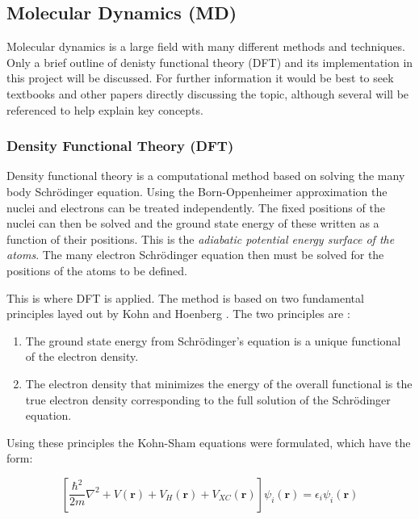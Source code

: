 \documentclass[a4paper,12pt]{article}
\begin{document}
\subsection{Molecular Dynamics (MD)}
Molecular dynamics is a large field with many different methods and techniques. Only a brief outline of denisty functional theory (DFT) and its implementation in this project will be discussed. For further information it would be best to seek textbooks and other papers directly discussing the topic, although several will be referenced to help explain key concepts.

\subsubsection{Density Functional Theory (DFT)}
Density functional theory is a computational method based on solving the many body Schrödinger equation. Using the Born-Oppenheimer approximation \cite{BornOpp} the nuclei and electrons can be treated independently. The fixed positions of the nuclei can then be solved and the ground state energy of these written as a function of their positions. This is the \textit{adiabatic potential energy surface of the atoms}. The many electron Schrödinger equation then must be solved for the positions of the atoms to be defined.

This is where DFT is applied. The method is based on two fundamental principles layed out by Kohn and Hoenberg \cite{InhomegasHohenberg}. The two principles are \cite{DFTintro}:
\bigskip
\begin{enumerate}
 \item The ground state energy from Schrödinger's equation is a unique functional of the electron density.
 
 \item The electron density that minimizes the energy of the overall functional is the true electron density corresponding to the full solution of the Schrödinger equation.
\end{enumerate}
\bigskip
Using these principles the Kohn-Sham equations \cite{DFTintro, ExCKohnSham} were formulated, which have the form:

\bigskip
\begin{equation}
\left[ \frac{\hbar ^2}{2m} \nabla ^2 + V(\textbf{r}) + V_H (\textbf{r}) + V_{XC} (\textbf{r})  \right] \psi _i (\textbf{r}) = \epsilon _i \psi _i (\textbf{r})
\end{equation}
\bigskip
\end{document}
